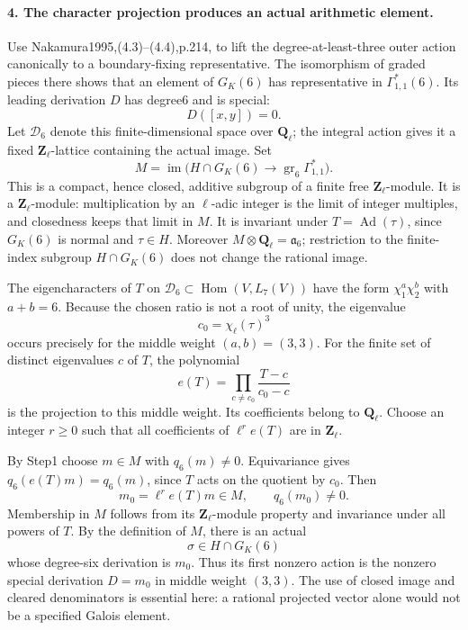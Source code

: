 \paragraph{4. The character projection produces an actual arithmetic element.}
Use Nakamura1995,(4.3)--(4.4),p.214, to lift the degree-at-least-three
outer action canonically to a boundary-fixing representative.
The isomorphism of graded pieces there shows that an element of
$G_K(6)$ has representative in $\Gamma^*_{1,1}(6)$.
Its leading derivation $D$ has degree6 and is special:
\[
 D([x,y])=0.
\]
Let $\mathcal D_6$ denote this finite-dimensional space over
$\mathbf Q_\ell$; the integral action gives it a fixed
$\mathbf Z_\ell$-lattice containing the actual image. Set
\[
 M=\operatorname{im}\bigl(H\cap G_K(6)\longrightarrow
       \operatorname{gr}_6\Gamma^*_{1,1}\bigr).
\]
This is a compact, hence closed, additive subgroup of a finite free
$\mathbf Z_\ell$-module. It is a $\mathbf Z_\ell$-module: multiplication
by an $\ell$-adic integer is the limit of integer multiples, and
closedness keeps that limit in $M$. It is invariant under
$T=\operatorname{Ad}(\tau)$, since $G_K(6)$ is normal and
$\tau\in H$. Moreover $M\otimes\mathbf Q_\ell=\mathfrak a_6$;
restriction to the finite-index subgroup $H\cap G_K(6)$ does not
change the rational image.

The eigencharacters of $T$ on $\mathcal D_6\subset
\operatorname{Hom}(V,L_7(V))$ have the form
$\chi_1^a\chi_2^b$ with $a+b=6$. Because the chosen ratio is not
a root of unity, the eigenvalue
\[
 c_0=\chi_\ell(\tau)^3
\]
occurs precisely for the middle weight $(a,b)=(3,3)$.
For the finite set of distinct eigenvalues $c$ of $T$, the polynomial
\[
 e(T)=\prod_{c\ne c_0}\frac{T-c}{c_0-c}
\]
is the projection to this middle weight. Its coefficients belong
to $\mathbf Q_\ell$. Choose an integer $r\ge0$ such that all
coefficients of $\ell^r e(T)$ are in $\mathbf Z_\ell$.

By Step1 choose $m\in M$ with $q_6(m)\ne0$. Equivariance gives
$q_6(e(T)m)=q_6(m)$, since $T$ acts on the quotient by $c_0$.
Then
\[
 m_0=\ell^r e(T)m\in M,\qquad q_6(m_0)\ne0.
\]
Membership in $M$ follows from its $\mathbf Z_\ell$-module property
and invariance under all powers of $T$. By the definition of $M$,
there is an actual
\[
 \sigma\in H\cap G_K(6)
\]
whose degree-six derivation is $m_0$. Thus its first nonzero action
is the nonzero special derivation $D=m_0$ in middle weight $(3,3)$.
The use of closed image and cleared denominators is essential here:
a rational projected vector alone would not be a specified Galois
element.

